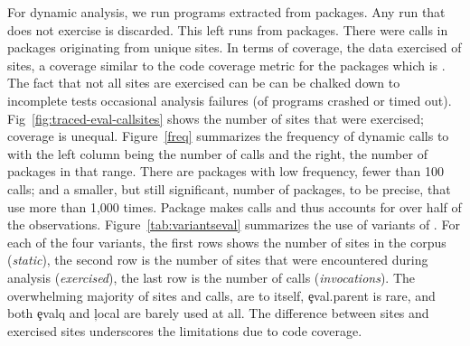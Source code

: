 \documentclass[screen,acmsmall]{acmart}
\begin{document}
For dynamic analysis, we run \CranRunnableScripts programs extracted from
\CranPackages packages. Any run that does not exercise \eval is discarded. This
left \packageNbruns runs from \packageCorpus packages. There were
\packageAllcalls calls in \packageTriggeredpkgs packages originating from
\PkgHitEvalCallSites unique sites. In terms of coverage, the data exercised
\PkgHitEvalCallSitesAvgRatio of sites, a coverage similar to the code coverage
metric for the packages which is \PkgCodeCoverage. The fact that not all sites
are exercised can be can be chalked down to incomplete tests occasional analysis
failures (\PkgFailedProgramsRatio of programs crashed or timed out).
Fig~\ref{fig:traced-eval-callsites} shows the number of sites that were
exercised; coverage is unequal. Figure~\ref{freq} summarizes the frequency of
dynamic calls to \eval with the left column being the number of calls and the
right, the number of packages in that range. There are \packageFewcalls packages
with low \eval frequency, fewer than 100 calls; and a smaller, but still
significant, number of packages, \packageManycalls to be precise, that use \eval
more than 1,000 times. Package \packageMaxcallspack makes \packageMaxcalls calls
and thus accounts for over half of the observations.
Figure~\ref{tab:variantseval} summarizes the use of variants of \eval. For each
of the four variants, the first rows shows the number of sites in the corpus
(\emph{static}), the second row is the number of sites that were encountered
during analysis (\emph{exercised}), the last row is the number of calls
(\emph{invocations}). The overwhelming majority of sites and calls, are to \eval
itself, \c{eval.parent} is rare, and both \c{evalq} and \c{local} are barely
used at all. The difference between sites and exercised sites underscores the
limitations due to code coverage.
\end{document}
